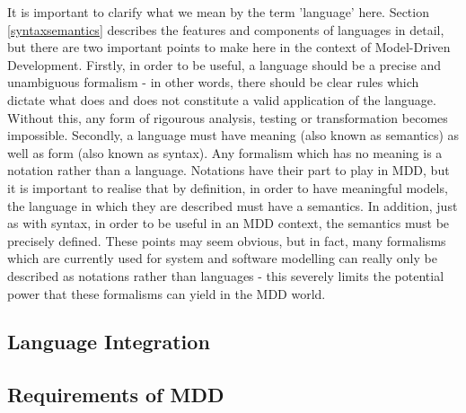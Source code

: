 It is important to clarify what we mean by the term 'language' here. Section \ref{syntaxsemantics} describes the features and components of languages in detail, but there are two important points to make here in the context of Model-Driven Development. Firstly, in order to be useful, a language should be a precise and unambiguous formalism - in other words, there should be clear rules which dictate what does and does not constitute a valid application of the language. Without this, any form of rigourous analysis, testing or transformation becomes impossible. Secondly, a language must have meaning (also known as semantics) as well as form (also known as syntax). Any formalism which has no meaning is a notation rather than a language. Notations have their part to play in MDD, but it is important to realise that by definition, in order to have meaningful models, the language in which they are described must have a semantics. In addition, just as with syntax, in order to be useful in an MDD context, the semantics must be precisely defined. These points may seem obvious, but in fact, many formalisms which are currently used for system and software modelling can really only be described as notations rather than languages - this severely limits the potential power that these formalisms can yield in the MDD world.




\subsection{Language Integration}


\subsection{Requirements of MDD} \label{mddreq}




